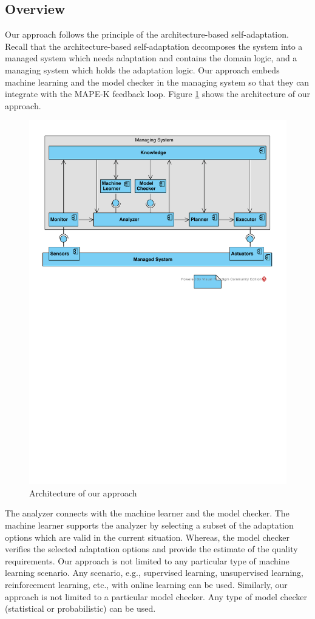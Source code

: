 \documentclass[a4paper,12pt]{article}
\begin{document}
\subsection{Overview}
Our approach follows the principle of the architecture-based self-adaptation. Recall that the architecture-based self-adaptation decomposes the system into a managed system which needs adaptation and contains the domain logic, and a managing system which holds the adaptation logic. Our approach embeds machine learning and the model checker in the managing system so that they can integrate with the MAPE-K feedback loop. Figure \ref{ArchitectureOverview} shows the architecture of our approach.
\begin{figure}[H]
	\centering
	\includegraphics[keepaspectratio, width=\linewidth]{figures/ArchitectureView.pdf}
	\caption{Architecture of our approach}
	\label{ArchitectureOverview}
\end{figure}
The analyzer connects with the machine learner and the model checker. The machine learner supports the analyzer by selecting a subset of the adaptation options which are valid in the current situation. Whereas, the model checker verifies the selected adaptation options and provide the estimate of the quality requirements. Our approach is not limited to any particular type of machine learning scenario. Any scenario, e.g., supervised learning, unsupervised learning, reinforcement learning, etc., with online learning can be used. Similarly, our approach is not limited to a particular model checker. Any type of model checker (statistical or probabilistic) can be used.
\end{document}
